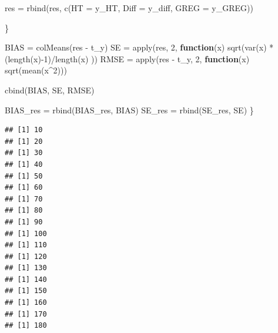 \documentclass[
]{article}
\newenvironment{Shaded}{\begin{snugshade}}{\end{snugshade}}
\newcommand{\AttributeTok}[1]{\textcolor[rgb]{0.77,0.63,0.00}{#1}}
\newcommand{\ControlFlowTok}[1]{\textcolor[rgb]{0.13,0.29,0.53}{\textbf{#1}}}
\newcommand{\DecValTok}[1]{\textcolor[rgb]{0.00,0.00,0.81}{#1}}
\newcommand{\FunctionTok}[1]{\textcolor[rgb]{0.00,0.00,0.00}{#1}}
\newcommand{\NormalTok}[1]{#1}
\newcommand{\OtherTok}[1]{\textcolor[rgb]{0.56,0.35,0.01}{#1}}
\newcommand{\SpecialCharTok}[1]{\textcolor[rgb]{0.00,0.00,0.00}{#1}}
\begin{document}
\begin{Shaded}
\begin{Highlighting}[]
\NormalTok{  res }\OtherTok{=} \FunctionTok{rbind}\NormalTok{(res, }\FunctionTok{c}\NormalTok{(}\AttributeTok{HT =}\NormalTok{ y\_HT, }\AttributeTok{Diff =}\NormalTok{ y\_diff, }\AttributeTok{GREG =}\NormalTok{ y\_GREG))}

  
\NormalTok{\}}

\NormalTok{BIAS }\OtherTok{=} \FunctionTok{colMeans}\NormalTok{(res }\SpecialCharTok{{-}}\NormalTok{ t\_y)}
\NormalTok{SE }\OtherTok{=} \FunctionTok{apply}\NormalTok{(res, }\DecValTok{2}\NormalTok{, }\ControlFlowTok{function}\NormalTok{(x) }\FunctionTok{sqrt}\NormalTok{(}\FunctionTok{var}\NormalTok{(x) }\SpecialCharTok{*}\NormalTok{ (}\FunctionTok{length}\NormalTok{(x)}\SpecialCharTok{{-}}\DecValTok{1}\NormalTok{)}\SpecialCharTok{/}\FunctionTok{length}\NormalTok{(x) ))}
\NormalTok{RMSE }\OtherTok{=} \FunctionTok{apply}\NormalTok{(res }\SpecialCharTok{{-}}\NormalTok{ t\_y, }\DecValTok{2}\NormalTok{, }\ControlFlowTok{function}\NormalTok{(x) }\FunctionTok{sqrt}\NormalTok{(}\FunctionTok{mean}\NormalTok{(x}\SpecialCharTok{\^{}}\DecValTok{2}\NormalTok{)))}

\FunctionTok{cbind}\NormalTok{(BIAS, SE, RMSE)}

\NormalTok{BIAS\_res }\OtherTok{=} \FunctionTok{rbind}\NormalTok{(BIAS\_res, BIAS)}
\NormalTok{SE\_res }\OtherTok{=} \FunctionTok{rbind}\NormalTok{(SE\_res, SE)}
\NormalTok{\}}
\end{Highlighting}
\end{Shaded}

\begin{verbatim}
## [1] 10
## [1] 20
## [1] 30
## [1] 40
## [1] 50
## [1] 60
## [1] 70
## [1] 80
## [1] 90
## [1] 100
## [1] 110
## [1] 120
## [1] 130
## [1] 140
## [1] 150
## [1] 160
## [1] 170
## [1] 180
\end{verbatim}
\end{document}
